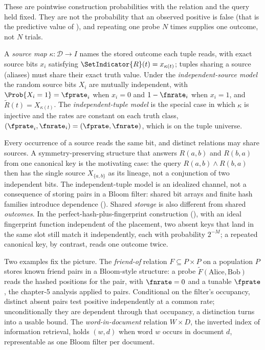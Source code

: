These are pointwise construction probabilities with the relation and the query
held fixed. They are not the probability that an observed positive is false
(that is the predictive value of ), and repeating
one probe $N$ times supplies one outcome, not $N$ trials.

\begin{definition}
\label{def:source-model}
A \emph{source map} $\kappa : \mathcal{D} \to I$ names the stored outcome each
tuple reads, with exact source bits $x_i$ satisfying $\SetIndicator{R}(t) =
x_{\kappa(t)}$; tuples sharing a source (aliases) must share their exact truth
value. Under the \emph{independent-source model} the random source bits $X_i$
are mutually independent, with $\Prob{X_i = 1} = \fprate_i$ when $x_i = 0$ and
$1 - \fnrate_i$ when $x_i = 1$, and $\tilde R(t) = X_{\kappa(t)}$. The
\emph{independent-tuple model} is the special case in which $\kappa$ is injective
and the rates are constant on each truth class, $(\fprate_i, \fnrate_i) =
(\fprate, \fnrate)$, which is  on the tuple universe.
\end{definition}

Every occurrence of a source reads the same bit, and distinct relations may share
sources. A symmetry-preserving structure that answers $R(a, b)$ and $R(b, a)$
from one canonical key is the motivating case: the query $R(a, b) \land R(b, a)$
then has the single source $X_{\{a, b\}}$ as its lineage, not a conjunction of
two independent bits. The independent-tuple model is an idealized channel, not a
consequence of storing pairs in a Bloom filter: shared bit arrays and finite hash
families introduce dependence (). Shared \emph{storage}
is also different from shared \emph{outcomes}. In the
perfect-hash-plus-fingerprint construction (), with
an ideal fingerprint function independent of the placement, two absent keys that
land in the same slot still match it independently, each with probability
$2^{-M}$; a repeated canonical key, by contrast, reads one outcome twice.

Two examples fix the picture. The \emph{friend-of} relation $F \subseteq P \times
P$ on a population $P$ stores known friend pairs in a Bloom-style structure: a
probe $\tilde F(\text{Alice}, \text{Bob})$ reads the hashed positions for the
pair, with $\fnrate = 0$ and a tunable $\fprate$, the chapter-5 analysis applied
to pairs. Conditional on the filter's occupancy, distinct absent pairs test
positive independently at a common rate; unconditionally they are dependent
through that occupancy, a distinction  turns into a
usable bound. The \emph{word-in-document} relation $W \times D$, the inverted
index of information retrieval, holds $(w, d)$ when word $w$ occurs in document
$d$, representable as one Bloom filter per document.

